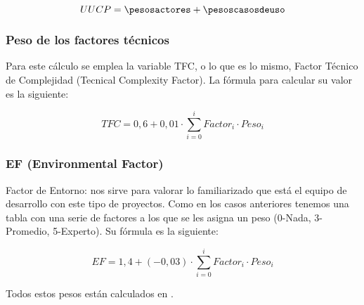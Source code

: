\[ UUCP = \pesosactores + \pesoscasosdeuso \]

\subsubsection*{Peso de los factores técnicos}
Para este cálculo se emplea la variable TFC, o lo que es lo mismo, Factor Técnico de Complejidad (Tecnical Complexity Factor). La fórmula para calcular su valor es la siguiente:

\[ TFC = 0,6 + 0,01 \cdot \sum_{i = 0}^{i} Factor_{i} \cdot Peso_{i} \]

\subsubsection*{EF (Environmental Factor)}
Factor de Entorno: nos sirve para valorar lo familiarizado que está el equipo de desarrollo con este tipo de proyectos. Como en los casos anteriores tenemos una tabla con una serie de factores a los que se les asigna un peso (0-Nada, 3-Promedio, 5-Experto). Su fórmula es la siguiente:

 \[ EF = 1,4 + (-0,03) \cdot \sum_{i = 0}^{i} Factor_{i} \cdot Peso_{i} \]
 
Todos estos pesos están calculados en .


